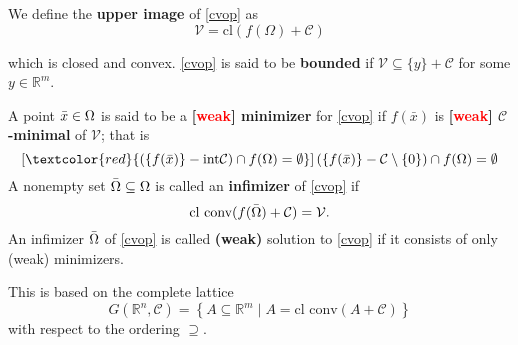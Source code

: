 \documentclass[10pt,xcolor={table,dvipsnames},t,unknownkeysallowed]{beamer}
\newcommand{\R}{\mathbb{R}}
\newcommand{\cone}[1]{\mathcal{#1}}
\newcommand{\bfemph}[1]{\textbf{\alert{#1}}}
\newcommand{\intr}{\text{int}}
\begin{document}
\begin{frame}{}
    We define the \bfemph{upper image} of \eqref{cvop} as 
    \begin{equation}\label{upper_img}
            \cone{V} = \text{cl}\left(f(\Omega)+\cone{C}\right)
    \end{equation}
    
    which is closed and convex.
    \newline
    \eqref{cvop} is said to be \bfemph{bounded} if $\cone{V}\subseteq \{y\}+ \cone{C}$ for some $y\in \R^m$.
    \begin{definition}
        A point $\Bar{x} \in \Omega$ is said to be a \bfemph{[\textcolor{red}{weak}] minimizer} for \eqref{cvop} if $f(\bar{x})$ is \bfemph{[\textcolor{red}{weak}] $\cone{C}$-minimal} of $\cone{V}$; that is
        \[
        \left[\textcolor{red}{\left(\{f(\Bar{x})\}-\intr{\cone{C}}\right)\cap f(\Omega) = \emptyset}\right] \left(\{f(\Bar{x})\}-\cone{C}\setminus \{0\}\right)\cap f(\Omega) = \emptyset
        \]
        A nonempty set $\Bar{\Omega} \subseteq \Omega $ is called an \bfemph{infimizer} of \eqref{cvop} if 
        \[
        \text{cl conv} (f(\Bar{\Omega}) + \cone{C}) = \cone{V}.
        \]
        An infimizer $\Bar{\Omega}$ of \eqref{cvop} is called \bfemph{(weak)} solution to \eqref{cvop} if it consists of only (weak) minimizers.
    \end{definition}
    This is based on the complete lattice 
    \[
    G(\R^n ,\cone{C}) = \left\{A \subseteq \R^m \;|\; A = \text{cl conv} (A +\cone{C})\right\}
    \]
    with respect to the ordering $\supseteq$.
\end{frame}
\end{document}
